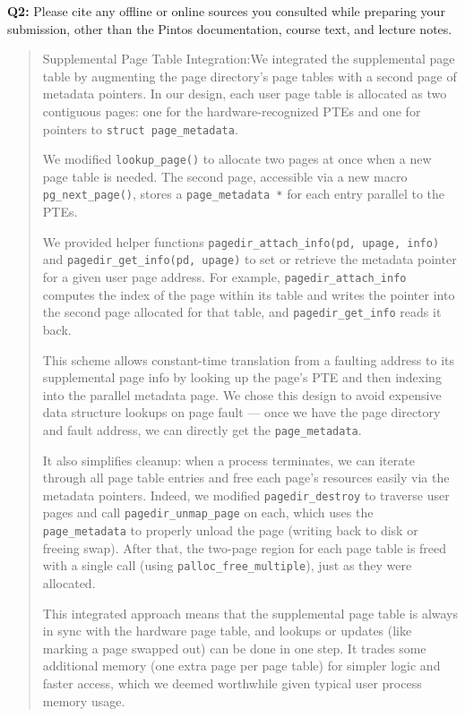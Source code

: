 \documentclass[a4paper,11pt]{paper}
\begin{document}
\textbf{Q2:} Please cite any offline or online sources you consulted while preparing your
submission, other than the Pintos documentation, course text, and lecture notes.
\begin{quote}
Supplemental Page Table Integration:We integrated the supplemental page table by augmenting the page directory’s page tables with a second page of metadata pointers. In our design, each user page table is allocated as two contiguous pages: one for the hardware-recognized PTEs and one for pointers to \texttt{struct page\_metadata}. 

We modified \texttt{lookup\_page()} to allocate two pages at once when a new page table is needed. The second page, accessible via a new macro \texttt{pg\_next\_page()}, stores a \texttt{page\_metadata *} for each entry parallel to the PTEs. 

We provided helper functions \texttt{pagedir\_attach\_info(pd, upage, info)} and \texttt{pagedir\_get\_info(pd, upage)} to set or retrieve the metadata pointer for a given user page address. For example, \texttt{pagedir\_attach\_info} computes the index of the page within its table and writes the pointer into the second page allocated for that table, and \texttt{pagedir\_get\_info} reads it back.

This scheme allows constant-time translation from a faulting address to its supplemental page info by looking up the page’s PTE and then indexing into the parallel metadata page. We chose this design to avoid expensive data structure lookups on page fault — once we have the page directory and fault address, we can directly get the \texttt{page\_metadata}.

It also simplifies cleanup: when a process terminates, we can iterate through all page table entries and free each page’s resources easily via the metadata pointers. Indeed, we modified \texttt{pagedir\_destroy} to traverse user pages and call \texttt{pagedir\_unmap\_page} on each, which uses the \texttt{page\_metadata} to properly unload the page (writing back to disk or freeing swap). After that, the two-page region for each page table is freed with a single call (using \texttt{palloc\_free\_multiple}), just as they were allocated.

This integrated approach means that the supplemental page table is always in sync with the hardware page table, and lookups or updates (like marking a page swapped out) can be done in one step. It trades some additional memory (one extra page per page table) for simpler logic and faster access, which we deemed worthwhile given typical user process memory usage.

\end{quote}
\end{document}
